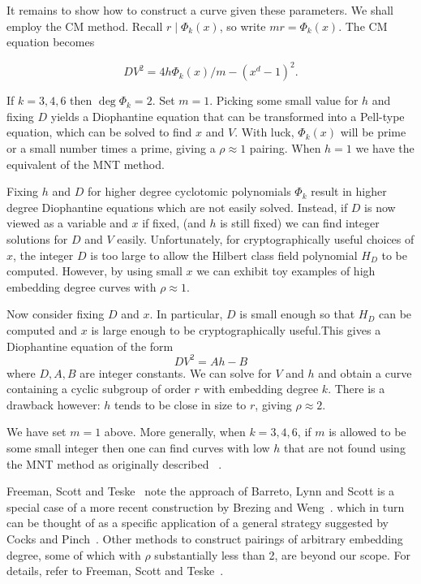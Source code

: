 It remains to show how to construct a curve given these parameters. We shall
employ the CM method.
Recall $r \mid \Phi_k(x)$, so write $m r = \Phi_k(x)$.
The CM equation becomes

\[ D V^2 = 4 h \Phi_k(x) / m -(x^d-1)^2 . \]

If $k=3,4,6$ then $\deg \Phi_k = 2$.
Set $m = 1$.
Picking some small value for $h$ and fixing $D$ yields
a Diophantine equation that can be transformed into a Pell-type equation,
which can be solved to find $x$ and $V$. With luck, $\Phi_k(x)$ will be
prime or a small number times a prime, giving a $\rho \approx 1$ pairing.
When $h=1$ we have the equivalent of the MNT method.

Fixing $h$ and $D$ for higher degree cyclotomic polynomials
$\Phi_k$ result in higher degree Diophantine equations which are not easily
solved.
Instead, if $D$ is now viewed as a variable and $x$ if fixed,
(and $h$ is still fixed) we can find integer solutions for $D$ and $V$
easily. Unfortunately, for cryptographically useful choices of $x$,
the integer $D$ is too large to allow the Hilbert class field polynomial $H_D$
to be computed.
However, by using small $x$ we can exhibit toy examples of high
embedding degree curves with $\rho \approx 1$.

Now consider fixing $D$ and $x$. In particular, $D$ is small enough so
that $H_D$ can be computed and $x$ is large enough to be cryptographically
useful.This gives a Diophantine
equation of the form
\[ D V^2 = Ah - B \]
where $D, A, B$ are integer constants. We can solve for $V$ and $h$ and
obtain a curve containing a cyclic subgroup of order $r$
with embedding degree $k$. There is a drawback however: $h$ tends to be close
in size to $r$, giving $\rho \approx 2$.

We have set $m = 1$ above. More generally,
when $k = 3,4,6$, if $m$ is allowed to be some small integer then one
can find curves with low $h$ that are not found using the MNT method as
originally described ~\cite{moremnt}.

Freeman, Scott and Teske~\cite{fst} note the approach of Barreto, Lynn and
Scott is a special case of a more recent construction by
Brezing and Weng~\cite{bw}. which in turn can be thought of as a specific
application of a general strategy suggested by Cocks and Pinch~\cite{cp}.
Other methods to construct pairings of arbitrary embedding degree,
some of which with $\rho$ substantially less than 2, are beyond our scope.
For details, refer to Freeman, Scott and Teske~\cite{fst}.
